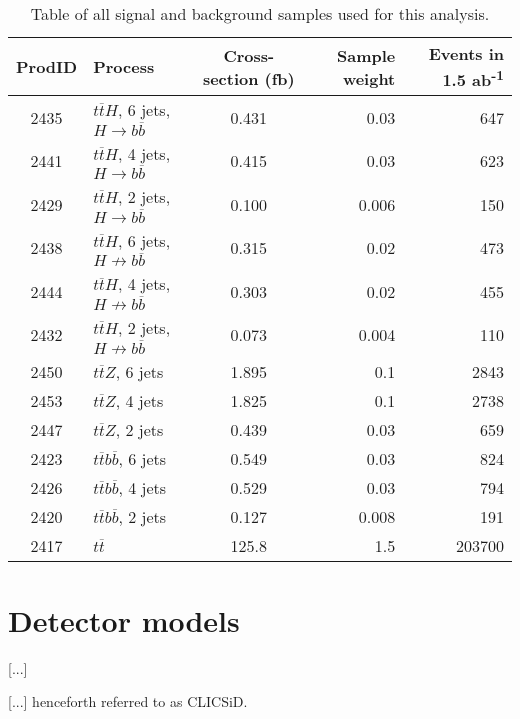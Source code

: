 \begin{table}[htp]
\centering
	\begin{tabular}{ c l c r r }
	\hline \hline
	ProdID & Process & Cross-section (fb) & Sample weight & Events in 1.5 ab\textsuperscript{-1} \\ \hline \hline
	2435 & $t\overline{t}H$, 6 jets, $H \rightarrow b\overline{b}$ & 0.431 & 0.03 & 647 \\
	2441 & $t\overline{t}H$, 4 jets, $H \rightarrow b\overline{b}$ & 0.415 & 0.03 & 623 \\ \hline
	2429 & $t\overline{t}H$, 2 jets, $H \rightarrow b\overline{b}$ & 0.100 & 0.006 & 150 \\

	2438 & $t\overline{t}H$, 6 jets, $H \not\rightarrow b\overline{b}$ & 0.315 & 0.02 & 473	 \\
	2444 & $t\overline{t}H$, 4 jets, $H \not\rightarrow b\overline{b}$ & 0.303 & 0.02 & 455 \\
	2432 & $t\overline{t}H$, 2 jets, $H \not\rightarrow b\overline{b}$ & 0.073 & 0.004 & 110 \\

	2450 & $t\overline{t}Z$, 6 jets & 1.895 & 0.1 & 2843 \\
	2453 & $t\overline{t}Z$, 4 jets & 1.825 & 0.1 & 2738 \\
	2447 & $t\overline{t}Z$, 2 jets & 0.439 & 0.03 & 659 \\
	
	2423 & $t\overline{t}b\overline{b}$, 6 jets & 0.549 & 0.03 & 824 \\
	2426 & $t\overline{t}b\overline{b}$, 4 jets & 0.529 & 0.03 & 794 \\
	2420 & $t\overline{t}b\overline{b}$, 2 jets & 0.127 & 0.008 & 191 \\

	2417 & $t\overline{t}$ & 125.8 & 1.5 & 203700 \\ \hline

	\end{tabular}
	\caption{Table of all signal and background samples used for this analysis.}
	\label{table:physics/SM/generatedsamples}
\end{table}

\section{Detector models}
[...]

[...] henceforth referred to as CLIC\textunderscore SiD.

